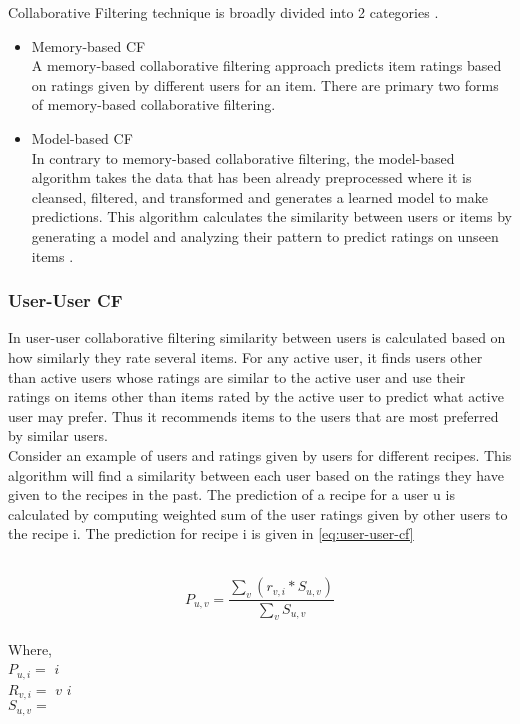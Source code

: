 \noindent Collaborative Filtering technique is broadly divided into 2 categories \cite{11}. 
\\
\begin{itemize}
\item Memory-based CF \\
A memory-based collaborative filtering approach predicts item ratings based on ratings given by different users for an item. There are primary two forms of memory-based collaborative filtering. 
\item Model-based CF \\
In contrary to memory-based collaborative filtering, the model-based algorithm takes the data that has been already preprocessed where it is cleansed, filtered, and transformed and generates a learned model to make predictions. This algorithm calculates the similarity between users or items by generating a model and analyzing their pattern to predict ratings on unseen items \cite{28,29,30}.
\end{itemize}

\subsubsection{User-User CF}

In user-user collaborative filtering similarity between users is calculated based on how similarly they rate several items. For any active user, it finds users other than active users whose ratings are similar to the active user and use their ratings on items other than items rated by the active user to predict what active user may prefer. Thus it recommends items to the users that are most preferred by similar users.
\\
Consider an example of users and ratings given by users for different recipes. This algorithm will find a similarity between each user based on the ratings they have given to the recipes in the past. The prediction of a recipe for a user u is calculated by computing weighted sum of the user ratings given by other users to the recipe i.
The prediction for recipe i is given in \autoref{eq:user-user-cf}

\\
\begin{equation}
P_{u,v} = \frac { \sum_v(r_{v,i} * S_{u,v})}{\sum_v S_{u,v}}
\label{eq:user-user-cf}
\end{equation}
\\
Where, 
\\
\noindent
$P_{u,i} = $  $i$ 
\\
$R_{v,i} = $  $v$  $i$ 
\\
$S_{u,v} = $ 
\\

